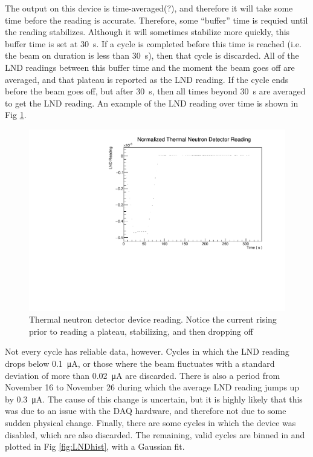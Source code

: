 \documentclass[10pt,letterpaper]{article}
\begin{document}
The output on this device is time-averaged(?), and therefore it will take some time before the reading is accurate. Therefore, some ``buffer'' time is requied until the reading stabilizes. Although it will sometimes stabilize more quickly, this buffer time is set at \SI{30}{\second}. If a cycle is completed before this time is reached (i.e. the beam on duration is less than \SI{30}{\second}), then that cycle is discarded. All of the LND readings between this buffer time and the moment the beam goes off are averaged, and that plateau is reported as the LND reading. If the cycle ends before the beam goes off, but after \SI{30}{\second}, then all times beyond \SI{30}{\second} are averaged to get the LND reading. An example of the LND reading over time is shown in Fig \ref{fig:LNDplateau}.

\begin{figure}
\centering
\includegraphics[width=\textwidth,page=1]{../thermal_neutron_detector/lndReadingVsTimeTCN18-042.pdf}
\caption{Thermal neutron detector device reading. Notice the current rising prior to reading a plateau, stabilizing, and then dropping off}
\label{fig:LNDplateau}
\end{figure}

Not every cycle has reliable data, however. Cycles in which the LND reading drops below \SI{0.1}{\micro\ampere}, or those where the beam fluctuates with a standard deviation of more than \SI{0.02}{\micro\ampere} are discarded. There is also a period from November 16 to November 26 during which the average LND reading jumps up by \approx\SI{0.3}{\micro\ampere}. The cause of this change is uncertain, but it is highly likely that this was due to an issue with the DAQ hardware, and therefore not due to some sudden physical change. Finally, there are some cycles in which the device was disabled, which are also discarded. The remaining, valid cycles are binned in and plotted in Fig \ref{fig:LNDhist}, with a Gaussian fit.
\end{document}
